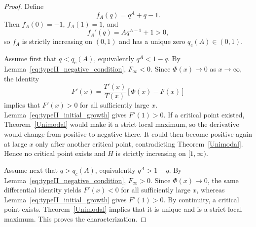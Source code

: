 \documentclass[10pt,a4paper]{amsart}
\theoremstyle{definition}
\theoremstyle{remark}
\numberwithin{equation}{section}
\begin{document}
\begin{proof}
Define
\[
f_A(q)=q^A+q-1.
\]
Then $f_A(0)=-1$, $f_A(1)=1$, and
\[
f_A'(q)=Aq^{A-1}+1>0,
\]
so $f_A$ is strictly increasing on $(0,1)$ and has a unique zero $q_c(A)\in(0,1)$.

Assume first that $q<q_c(A)$, equivalently $q^A<1-q$. By Lemma~\ref{eq:typeII_negative_condition}, $F_\infty<0$. Since $\Phi(x)\to0$ as $x\to\infty$, the identity
\[
F'(x)=\frac{T'(x)}{T(x)}[\Phi(x)-F(x)]
\]
implies that $F'(x)>0$ for all sufficiently large $x$. Lemma~\ref{eq:typeII_initial_growth} gives $F'(1)>0$. If a critical point existed, Theorem~\ref{Unimodal} would make it a strict local maximum, so the derivative would change from positive to negative there. It could then become positive again at large $x$ only after another critical point, contradicting Theorem~\ref{Unimodal}. Hence no critical point exists and $H$ is strictly increasing on $[1,\infty)$.

Assume next that $q>q_c(A)$, equivalently $q^A>1-q$. By Lemma~\ref{eq:typeII_negative_condition}, $F_\infty>0$. Since $\Phi(x)\to0$, the same differential identity yields $F'(x)<0$ for all sufficiently large $x$, whereas Lemma~\ref{eq:typeII_initial_growth} gives $F'(1)>0$. By continuity, a critical point exists. Theorem~\ref{Unimodal} implies that it is unique and is a strict local maximum. This proves the characterization.
%
%
%
%
%
%
%
%
%
%
%
%
\end{proof}
\end{document}
